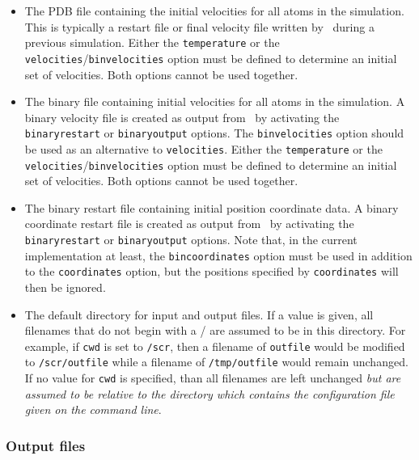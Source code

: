 \begin{itemize}
\item
{}
{\label{param:velocities}
The PDB file containing the initial velocities for all 
atoms in the simulation.  
This is typically a restart file or final velocity file written 
by \NAMD\ during a previous simulation.  
Either the {\tt temperature} 
or the {\tt velocities}/{\tt binvelocities} 
option must be defined to determine an initial set of velocities.  
Both options cannot be used together.}

\item
{}
{\label{param:binvelocities}
The binary file containing initial velocities for all 
atoms in the simulation.  
A binary velocity file is created as output from \NAMD\ 
by activating the {\tt binaryrestart} or {\tt binaryoutput} options.  
The {\tt binvelocities} option should be used as 
an alternative to {\tt velocities}.  
Either the {\tt temperature} 
or the {\tt velocities}/{\tt binvelocities} 
option must be defined to determine an initial set of velocities.  
Both options cannot be used together.  
}

\item
{}
{
The binary restart file containing initial position 
coordinate data.  
A binary coordinate restart file is created as output from \NAMD\ 
by activating the {\tt binaryrestart} or {\tt binaryoutput} options.  
Note that, in the current implementation at least, 
the {\tt bincoordinates} option must be used in addition 
to the {\tt coordinates} option, 
but the positions specified by {\tt coordinates} will then be ignored.  
}

\item
{}
{The default directory for input and output files.  
If a value is given, all filenames that 
do not begin with a / are assumed to be in this directory.  
For example, if {\tt cwd} is set to {\tt /scr}, then a
filename of {\tt outfile} would be modified to {\tt /scr/outfile}
while a filename of {\tt /tmp/outfile} would remain unchanged.
If no value for {\tt cwd} is specified, than all filenames are 
left unchanged {\em but are assumed to be relative to the directory
which contains the configuration file given on the command line}.}

\end{itemize}

\subsubsection{Output files}

